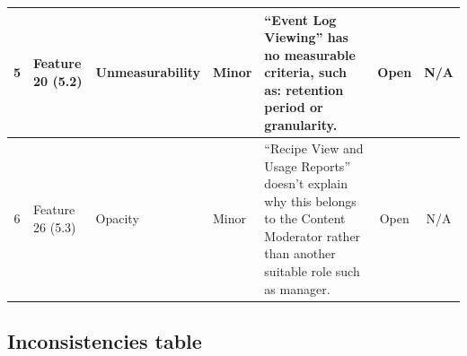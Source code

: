 \documentclass[11pt]{article}
\begin{document}
\begin{longtable}{|c|p{2.3cm}|p{2cm}|p{1.5cm}|p{4.5cm}|c|c|}
5 & Feature 20 (5.2) & Unmeasurability & Minor & ``Event Log Viewing'' has no measurable criteria, such as: retention period or granularity. & Open & N/A \\
\hline

6 & Feature 26 (5.3) & Opacity & Minor & ``Recipe View and Usage Reports'' doesn't explain why this belongs to the Content Moderator rather than another suitable role such as manager. & Open & N/A \\
\hline

\end{longtable}


\subsection{Inconsistencies table}
\end{document}
